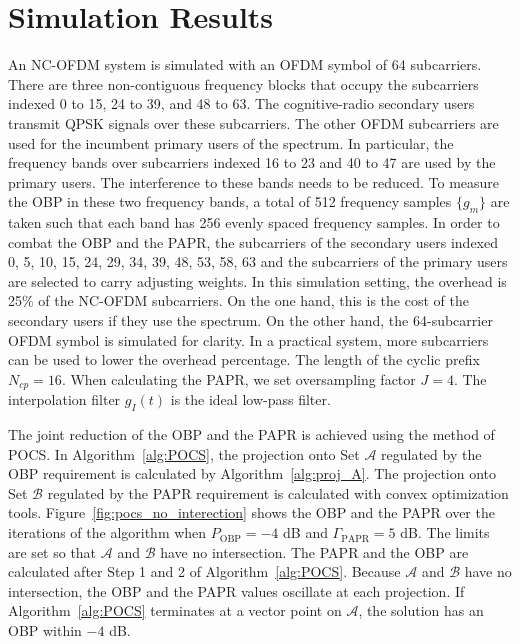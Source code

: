 \documentclass[paper]{ieice}
\begin{document}
\section{Simulation Results} \label{sec:NumericalResults}


An NC-OFDM system is simulated with an OFDM symbol of 64 subcarriers.  There are three non-contiguous frequency blocks that occupy the subcarriers indexed 0 to 15, 24 to 39, and 48 to 63.   The cognitive-radio secondary users transmit QPSK signals over these subcarriers.  The other OFDM subcarriers are used for the incumbent primary users of the spectrum.  In particular, the frequency bands over subcarriers indexed 16 to 23 and 40 to 47 are used by the primary users. The interference to these bands needs to be reduced.  To measure the OBP in these two frequency bands, a total of 512 frequency samples $\{g_{m}\}$ are taken such that each band has 256 evenly spaced frequency samples.
In order to combat the OBP and the PAPR, the subcarriers of the secondary users indexed 0, 5, 10, 15, 24, 29, 34, 39, 48, 53, 58, 63 and the subcarriers of the primary users are selected to carry adjusting weights.  In this simulation setting, the overhead is 25\% of the NC-OFDM subcarriers.  On the one hand, this is the cost of the secondary users if they use the spectrum.  On the other hand, the 64-subcarrier OFDM symbol is simulated for clarity.  In a practical system, more subcarriers can be used to lower the overhead percentage. The length of the cyclic prefix $N_{cp} = 16$. When calculating the PAPR, we set oversampling factor $J = 4$. The interpolation filter $g_I(t)$ is the ideal low-pass filter.

The joint reduction of the OBP and the PAPR is achieved using the method of POCS.  In Algorithm~\ref{alg:POCS}, the projection onto Set $\mathcal{A}$ regulated by the OBP requirement is calculated by Algorithm~\ref{alg:proj_A}. The projection onto Set $\mathcal{B}$ regulated by the PAPR requirement is calculated with convex optimization tools.   Figure~\ref{fig:pocs_no_interection} shows the OBP and the PAPR over the iterations of the algorithm when $P_{\mathrm{OBP}} =  -4$ dB and $\Gamma_{\mathrm{PAPR}} =  5$ dB. The limits are set so that $\mathcal{A}$ and $\mathcal{B}$ have no intersection. The PAPR and the OBP are calculated after Step 1 and 2 of Algorithm~\ref{alg:POCS}.   Because $\mathcal{A}$ and $\mathcal{B}$ have no intersection, the OBP and the PAPR values oscillate at each projection.  If Algorithm~\ref{alg:POCS} terminates at a vector point on $\mathcal{A}$, the solution has an OBP within $-4$ dB. 
\end{document}
